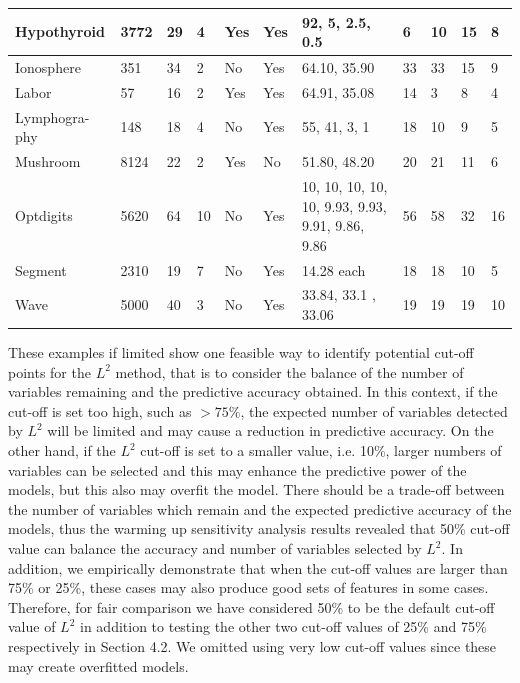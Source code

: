 \documentclass[review]{elsarticle}
\begin{document}
\begin{table}[tp]
\begin{tabular}{|p{1.7cm}|p{0.6cm}|p{0.7cm}|p{0.6cm}|p{0.7cm}|p{0.7cm}|L|p{0.5cm}|p{0.5cm}|p{1cm}|p{1cm}|}
\hline Hypothyroid & 3772 & 29 & 4 & Yes & Yes & 92, 5, 2.5, 0.5 & 6 & 10 & 15 & 8 \\ 
\hline Ionosphere & 351 & 34 & 2 & No & Yes & 64.10, 35.90 & 33 & 33 & 15 & 9 \\ 
\hline Labor & 57 & 16 & 2 & Yes & Yes & 64.91, 35.08 & 14 & 3 & 8 & 4 \\ 
\hline Lymphogra-phy & 148 & 18 & 4 & No & Yes & 55, 41, 3, 1 & 18 & 10 & 9 & 5 \\ 
\hline Mushroom & 8124 & 22 & 2 & Yes & No & 51.80, 48.20 & 20 & 21 & 11 & 6 \\ 
\hline Optdigits & 5620 & 64 & 10 & No & Yes & 10, 10, 10, 10, 10,  9.93, 9.93, 9.91, 9.86, 9.86 & 56 & 58 & 32 & 16 \\ 
\hline Segment & 2310 & 19 & 7 & No & Yes & 14.28 each & 18 & 18 & 10 & 5 \\ 
\hline Wave & 5000 & 40 & 3 & No & Yes & 33.84, 33.1 , 33.06 & 19 & 19 & 19 & 10 \\ 
	\hline 
\end{tabular} 
\hspace*{-4cm}	


\end{table}


These examples if limited show one feasible way to identify potential cut-off points for the $ L^2 $ method, that is to consider the balance of the number of variables remaining and the predictive accuracy obtained. In this context, if the cut-off is set too high, such as $ > 75\% $, the expected number of variables detected by $ L^2 $ will be limited and may cause a reduction in predictive accuracy. On the other hand, if the $ L^2 $ cut-off is set to a smaller value, i.e. 10\%, larger numbers of variables can be selected and this may enhance the predictive power of the models, but this also may overfit the model. There should be a trade-off between the number of variables which remain and the expected predictive accuracy of the models, thus the warming up sensitivity analysis results revealed that 50\% cut-off value can balance the accuracy and number of variables selected by $ L^2 $.  In addition, we empirically demonstrate that when the cut-off values are larger than 75\% or 25\%, these cases may also produce good sets of features in some cases. Therefore, for fair comparison we have considered 50\% to be the default cut-off value of  $ L^2 $ in addition to testing the other two cut-off values of 25\% and 75\% respectively in Section 4.2. We omitted using very low cut-off values since these may create overfitted models. 
\end{document}
